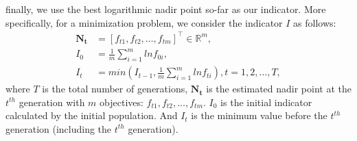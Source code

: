 \documentclass[conference]{IEEEtran}
\begin{document}
finally, we use the best logarithmic nadir point so-far as our indicator. More specifically,
for a minimization problem, we consider the indicator $I$ as follows:
\begin{equation}\begin{aligned}\label{ewcd1}
  \boldsymbol{N_{t}} &= [f_{t1},f_{t2},\dots,f_{tm}]^\top \in \mathbb{R}^m ,\\
  I_{0} &= \frac{1}{m} \sum_{i=1}^{m}lnf_{0i},\\
  I_{t} &= min(I_{t-1},\frac{1}{m} \sum_{i=1}^{m}lnf_{ti}),
  t = 1,2,\dots,T,
\end{aligned}
\end{equation}
where $T$ is the total number of generations, 
$\boldsymbol{N_{t}}$ is the estimated nadir point at the $t^{th}$ generation with $m$ objectives: $f_{t1},f_{t2},\dots,f_{tm}$. 
$I_0$ is the initial indicator calculated by the initial population.
And $I_t$ is the minimum value before the $t^{th}$ generation (including the $t^{th}$ generation). 
\end{document}
